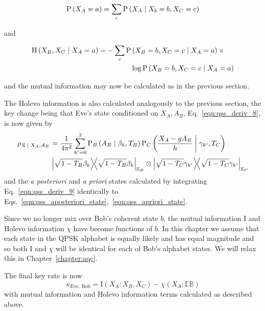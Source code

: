 \begin{equation}
\text{P}\left(X_A=a\right) = \sum_{c} \text{P}\left(X_A \; \middle| \; X_b=b, X_C=c\right)
\end{equation}

\noindent and

\begin{align}
\text{H}\left(X_B, X_C \; \middle| \; X_A=a\right) = - \sum_{c} \text{P}&\left(X_B=b, X_C=c \; \middle| \; X_A=a\right) \times \notag \\
&\log \text{P}\left(X_B=b, X_C=c \; \middle| \; X_A=a\right)
\end{align}

\noindent and the mutual information may now be calculated as in the previous section. 

The Holevo information is also calculated analogously to the previous section, the key change being that Eve's state conditioned on $X_A, A_B$, Eq.~\ref{eqn:qss_deriv_8}, is now given by
\begin{align}\label{eqn:qss_deriv_9}
\rho_{\left.\mathbb{E} \given X_A, A_B\right.} &= \frac{1}{4 \pi^2} \sum_{k^\prime=0}^3 \text{P}_B\left(A_B \given \beta_k, T_B\right) \text{P}_C\left(\frac{X_A - g A_B}{h} \given \gamma_{k^\prime}, T_C\right) \notag \\
%
&\dyad{\sqrt{1-T_B} \beta_k}_{\mathbb{E}_B} \otimes \dyad{\sqrt{1-T_C}\gamma_{k^\prime}}_{\mathbb{E}_C}
\end{align}
and the \emph{a posteriori} and \emph{a priori} states calculated by integrating Eq.~\ref{eqn:qss_deriv_9} identically to Eqs.~\ref{eqn:qss_aposteriori_state},~\ref{eqn:qss_apriori_state}.

Since we no longer mix over Bob's coherent state $b$, the mutual information $\text{I}$ and Holevo information $\chi$ have become functions of $b$. In this chapter we assume that each state in the QPSK alphabet is equally likely and has equal magnitude and so both $\text{I}$ and $\chi$ will be identical for each of Bob's alphabet states. We will relax this in Chapter~\ref{chapter:aqc}.


The final key rate is now
\begin{equation}\label{eqn:qss_keyrate_dishonest_Bob}
\kappa_{\text{Eve, Bob}} = \text{I}\left(X_A : X_B, X_C\right) - \chi\left(X_A : \mathbb{E} \mathbb{B}\right)
\end{equation}
with mutual information and Holevo information terms calculated as described above.




